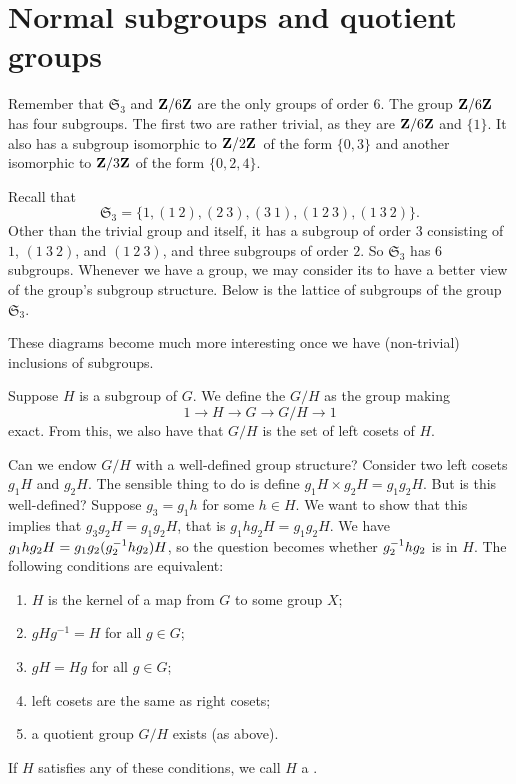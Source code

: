 \documentclass[11pt, twoside]{amsart}
\begin{document}
\section{Normal subgroups and quotient groups}
Remember that $\mathfrak{S}_3$ and $\mathbf{Z}/6\mathbf{Z}$ are the only groups of order $6$. The group $\mathbf{Z}/6\mathbf{Z}$ has four subgroups. The first two are rather trivial, as they are $\mathbf{Z}/6\mathbf{Z}$ and $\{1\}$. It also has a subgroup isomorphic to $\mathbf{Z}/2\mathbf{Z}$\ of the form $\{0,3\}$ and another isomorphic to $\mathbf{Z}/3\mathbf{Z}$ of the form $\{0,2,4\}$. 

Recall that 
$$
\mathfrak{S}_3 = \{ 1, (1\ 2), (2\ 3) , (3\ 1), (1\ 2\ 3), (1\ 3\ 2)\}.
$$
Other than the trivial group and itself, it has a subgroup of order $3$ consisting of $1$, $(1\ 3\ 2)$, and $(1\ 2\ 3)$, and three subgroups of order $2$. So $\mathfrak{S}_3$ has $6$ subgroups. Whenever we have a group, we may consider its  to have a better view of the group's subgroup structure. Below is the lattice of subgroups of the group $\mathfrak{S}_3$.
\begin{center}
\end{center}
These diagrams become much more interesting once we have (non-trivial) inclusions of subgroups.

Suppose $H$ is a subgroup of $G$. We define the  $G/H$ as the group making
$$
1\longrightarrow H\longrightarrow G \longrightarrow G/H\longrightarrow 1
$$
exact. From this, we also have that $G/H$ is the set of left cosets of $H$. 

Can we endow $G/H$ with a well-defined group structure? Consider two left cosets $g_1H$ and $g_2H$. The sensible thing to do is define $g_1H \times g_2H = g_1g_2H$. But is this well-defined? Suppose $g_3=g_1h$ for some $h\in H$. We want to show that this implies that $g_3g_2 H = g_1g_2H$, that is $g_1hg_2H = g_1g_2H$. We have $g_1hg_2H = g_1g_2(g_2^{-1} h g_2) H$, so the question becomes whether $g_2^{-1} hg_2$ is in $H$. The following conditions are equivalent:
\begin{enumerate}
\item $H$ is the kernel of a map from $G$ to some group $X$;
\item $gHg^{-1} = H$ for all $g\in G$;
\item $gH = Hg$ for all $g\in G$;
\item left cosets are the same as right cosets;
\item a quotient group $G/H$ exists (as above).
\end{enumerate}
If $H$ satisfies any of these conditions, we call $H$ a .
\end{document}
